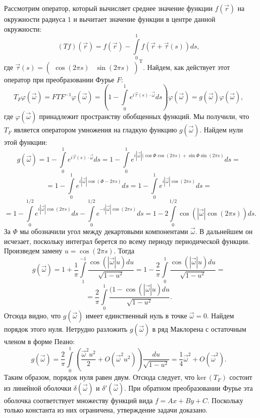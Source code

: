 \documentclass{article}
\begin{document}
Рассмотрим оператор, который вычисляет среднее значение функции $f(\vec{r})$ на окружности радиуса $1$ и вычитает значение функции в центре данной окружности:
$$(Tf) (\vec{r}) = f(\vec{r}) - \int\limits_{0}^{1} f(\vec{r} + \vec{\tau} (s)) ds,$$
где $\vec{\tau} (s) = (\begin{array}{cc} \cos (2\pi s) & \sin (2\pi s) \end{array})^\mathrm{T}$.
Найдем, как действует этот оператор при преобразовании Фурье $F$:
$$T_{F} \varphi (\vec{\omega}) = F T F^{-1} \varphi (\vec{\omega}) = \left(1 - \int\limits_{0}^{1} e^{i \vec{\tau} (s) \cdot \vec{\omega}} ds \right) \varphi (\vec{\omega}) = g(\vec{\omega}) \varphi (\vec{\omega}),$$
где $\varphi (\vec{\omega})$ принадлежит пространству обобщенных функций. Мы получили, что $T_F$ является оператором умножения на гладкую функцию $g(\vec{\omega})$. Найдем нули этой функции:
$$g(\vec{\omega}) =  1 - \int\limits_{0}^{1} e^{i \vec{\tau} (s) \cdot \vec{\omega}} ds = 1 - \int\limits_{0}^{1} e^{i |\vec{\omega}| (\cos \Phi \cos (2\pi s) +\sin \Phi  \sin (2\pi s)}ds = $$
$$ = 1 - \int\limits_{0}^{1} e^{i |\vec{\omega}| \cos (\Phi - 2\pi s)}ds = 1 - \int\limits_{0}^{1} e^{i |\vec{\omega}| \cos (2\pi s)}ds = $$
$$ = 1 - \int\limits_{0}^{1/2} e^{i |\vec{\omega}| \cos (2\pi s)} ds - \int\limits_{0}^{1/2} e^{-i |\vec{\omega}| \cos (2\pi s)}ds = 1 - 2 \int\limits_{0}^{1/2} \cos(|\vec{\omega}| \cos (2\pi s))ds.$$
За $\Phi$ мы обозначили угол между декартовыми компонентами $\vec{\omega}$. В дальнейшем он исчезает, поскольку интеграл берется по всему периоду периодической функции. Произведем замену $u = \cos (2\pi s)$. Тогда
$$g(\vec{\omega}) = 1 + \frac{1}{\pi} \int\limits_{1}^{-1} \frac{\cos(|\vec{\omega}| u) du}{\sqrt{1 - u^2}} = 1 - \frac{2}{\pi} \int\limits_{0}^{1} \frac{\cos(|\vec{\omega}| u) du}{\sqrt{1 - u^2}} = $$
$$ = \frac{2}{\pi} \int\limits_0^1 \frac{(1 - \cos(|\vec{\omega}| u) du}{\sqrt{1 - u^2}}.$$
Отсюда видно, что $g(\vec{\omega})$ имеет единственный нуль в точке $\vec{\omega} = 0$. Найдем порядок этого нуля. Нетрудно разложить $g(\vec{\omega})$ в ряд Маклорена с остаточным членом в форме Пеано:
$$g(\vec{\omega}) = \frac{2}{\pi} \int\limits_0^1 \left(\frac{\vec{\omega}^2u^2}{2} + O(\vec{\omega}^2u^2) \right) \frac{du}{\sqrt{1 - u^2}} = \frac14 \vec{\omega}^2 + O(\vec{\omega}^2).$$
Таким образом, порядок нуля равен двум. Отсюда следует, что $\text{ker}\, (T_F)$ состоит из линейной оболочки $\delta(\vec{\omega})$ и $\delta'(\vec{\omega})$. При обратном преобразовании Фурье эта оболочка соответствует множеству функций вида $f = Ax + By + C$. Поскольку только константа из них ограничена, утверждение задачи доказано.
\end{document}
